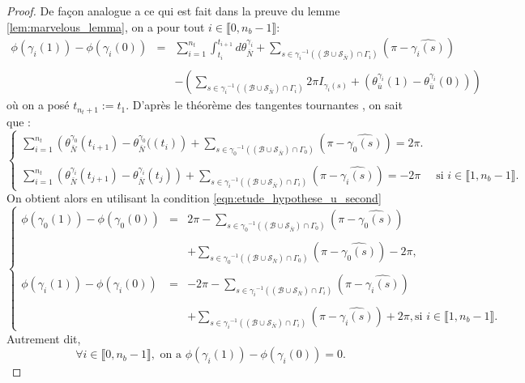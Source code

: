 \begin{proof}
De façon analogue a ce qui est fait dans la preuve du lemme \ref{lem:marvelous_lemma}, on a pour tout $i\in\llbracket 0, n_b-1\rrbracket$:
$$
\begin{array}{lcl}
    \phi(\gamma_i(1))-\phi(\gamma_i(0))&=&\displaystyle\sum_{i=1}^{n_t}\int_{t_i}^{t_{i+1}}d\theta_{\bar{N}}^{\gamma_i}+\sum_{s\in{\gamma_i}^{-1}((\mathcal{B}\cup\mathcal{S}_{\bar{N}})\cap\Gamma_i)}\left(\pi-\widehat{\gamma_i(s)}\right)\\\\
    &&-\displaystyle\left(\sum_{s\in{\gamma_i}^{-1}((\mathcal{B}\cup\mathcal{S}_{\bar{N}})\cap\Gamma_i)}2\pi I_{\gamma_i(s)}+(\theta_{\bar{u}}^{\gamma_i}(1)-\theta_{\bar{u}}^{\gamma_i}(0))\right)
\end{array}
$$
    où on a posé $t_{n_t+1}:=t_1$. D'après le théorème des tangentes tournantes \cite{hopf1935drehung, rotskoff2010gauss}, on sait que :
    $$
    \left\{
    \begin{array}{ll}
    \displaystyle\sum_{i=1}^{n_t}\left(\theta_{\bar{N}}^{\gamma_0}(t_{i+1})-\theta_{\bar{N}}^{\gamma_0}((t_i)\right)+\sum_{s\in{\gamma_0}^{-1}((\mathcal{B}\cup\mathcal{S}_{\bar{N}})\cap\Gamma_0)}\left(\pi-\widehat{\gamma_0(s)}\right)=2\pi.\\\\
    \displaystyle\sum_{i=1}^{n_t}\left(\theta_{\bar{N}}^{\gamma_i}(t_{j+1})-\theta_{\bar{N}}^{\gamma_i}(t_j)\right)+\sum_{s\in{\gamma_i}^{-1}((\mathcal{B}\cup\mathcal{S}_{\bar{N}})\cap\Gamma_i)}\left(\pi-\widehat{\gamma_i(s)}\right)=-2\pi&\mbox{ si }i\in\llbracket1, n_b-1\rrbracket.
    \end{array}
    \right.
    $$
    On obtient alors en utilisant la condition \eqref{eqn:etude_hypothese_u_second}
    $$
    \left\{
    \begin{array}{lcl}
    \phi(\gamma_0(1))-\phi(\gamma_0(0))&=&2\pi-\displaystyle\sum_{s\in{\gamma_0}^{-1}((\mathcal{B}\cup\mathcal{S}_{\bar{N}})\cap\Gamma_0)}\left(\pi-\widehat{\gamma_0(s)}\right)\\\\
    &&+\displaystyle\sum_{s\in{\gamma_0}^{-1}((\mathcal{B}\cup\mathcal{S}_{\bar{N}})\cap\Gamma_0)}\left(\pi-\widehat{\gamma_0(s)}\right)-2\pi,\\\\
    \phi(\gamma_i(1))-\phi(\gamma_i(0))&=&-2\pi-\displaystyle\sum_{s\in{\gamma_i}^{-1}((\mathcal{B}\cup\mathcal{S}_{\bar{N}})\cap\Gamma_i)}\left(\pi-\widehat{\gamma_i(s)}\right)\\\\
    &&+\displaystyle\sum_{s\in{\gamma_i}^{-1}((\mathcal{B}\cup\mathcal{S}_{\bar{N}})\cap\Gamma_i)}\left(\pi-\widehat{\gamma_i(s)}\right)+2\pi, \mbox{si }i\in\llbracket 1, n_b-1\rrbracket.
    \end{array}
    \right.
    $$
    Autrement dit,
    $$
    \forall i\in\llbracket 0, n_b-1\rrbracket,\mbox{ on a }\phi(\gamma_i(1))-\phi(\gamma_i(0))=0.
    $$
\end{proof}
